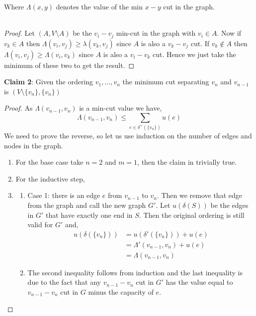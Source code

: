 \documentclass{article}
\numberwithin{equation}{section}
\begin{document}
Where $\Lambda(x, y)$ denotes the value of the min $x-y$ cut in the graph. \\\\
\begin{proof}
Let $(A, V\setminus A)$ be the $v_i-v_j$ min-cut in the graph with $v_i \in A$. Now if $v_k \in A$ then $\Lambda(v_i, v_j) \ge \lambda(v_k, v_j)$ since $A$
is also a $v_k-v_j$ cut. If $v_k\notin A$ then $\Lambda(v_i, v_j) \ge \Lambda(v_i, v_k)$ since $A$ is also a $v_i-v_k$ cut. Hence we just take the minimum of these two to get the result.
\end{proof}
\noindent\textbf{Claim 2}: Given the ordering $v_1, \dots, v_n$ the minimum cut separating $v_n$ and $v_{n-1}$ is $(V\setminus\{v_n\}, \{v_n\})$ 
\begin{proof}
    As $\Lambda(v_{n-1}, v_n)$ is a min-cut value we have, 
    \begin{equation}
        \Lambda(v_{n-1}, v_n) \le \sum_{e \in \delta^+(\{v_n\})} u(e)
    \end{equation}
    We need to prove the reverse, so let us use induction on the number of edges and nodes in the graph. 
    \begin{enumerate}
        \item For the base case take $n=2$ and $m=1$, then the claim in trivially true. 
        \item For the inductive step, 
        \item[] \begin{enumerate}
                    \item Case 1: there is an edge $e$ from $v_{n-1}$ to $v_n$. Then we remove that edge from the graph and call the new graph $G'$. Let $u(\delta(S))$ be the edges in $G'$ that have exactly one end in $S$. Then the original ordering is still valid for $G'$ and, 
                    \begin{equation}
                        \begin{split}
                            u(\delta(\{v_n\})) &= u(\delta'(\{v_n\})) + u(e)\\
                            &= \Lambda'(v_{n-1}, v_n) + u(e)\\
                            &= \Lambda(v_{n-1}, v_n)
                        \end{split}
                    \end{equation}
                    \item[] The second inequality follows from induction and the last inequality is due to the fact that any $v_{n-1}-v_n$ cut in $G'$ has the value equal to $v_{n-1}-v_n$ cut in $G$ minus the capacity of $e$. 

\end{enumerate}
\end{enumerate}
\end{proof}
\end{document}
